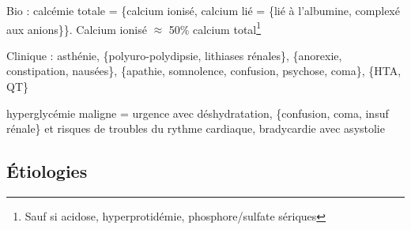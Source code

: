 \documentclass{book}
\begin{document}
Bio : calcémie totale = \{calcium ionisé, calcium lié = \{lié à l'albumine,
complexé aux anions\}\}. Calcium ionisé \(\approx\) 50\% calcium total\footnote{Sauf si acidose, hyperprotidémie, \inc phosphore/sulfate sériques}

Clinique : asthénie, \{polyuro-polydipsie, lithiases rénales\}, \{anorexie,
constipation, nausées\}, \{apathie, somnolence, confusion, psychose, coma\}, \{HTA,
\dec QT\}

\danger hyperglycémie maligne = urgence \faBomb{} avec déshydratation, \{confusion,
coma, insuf rénale\} et risques de troubles du rythme cardiaque, bradycardie avec asystolie

\subsection{Étiologies}
\label{sec:org5e2ef90}
\end{document}
